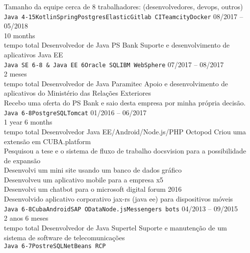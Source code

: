 \begin{entrylist}
{    Tamanho da equipe cerca de 8 trabalhadores: (desenvolvedores, devops, outros) \\
    \texttt{Java 4-15}\slashsep\texttt{Kotlin}\slashsep\texttt{Spring}\slashsep\texttt{Postgres}\slashsep\texttt{Elastic}\slashsep\texttt{Gitlab CI}\slashsep\texttt{Teamcity}\slashsep\texttt{Docker}}
    \entry
    {08/2017 -- 05/2018\\\footnotesize{10 months\\tempo total}}
    {Desenvolvedor de Java}
    {PS Bank}
    {
        Suporte e desenvolvimento de aplicativos Java EE \\
        \texttt{Java SE 6-8 \& Java EE 6}\slashsep\texttt{Oracle SQL}\slashsep\texttt{IBM WebSphere}}
    \entry
    {07/2017 -- 08/2017\\\footnotesize{2 meses\\tempo total}}
    {Desenvolvedor de Java}
    {Paramitec}
    {
        Apoio e desenvolvimento de aplicativos do Ministério das Relações Exteriores \\
        Recebo uma oferta do PS Bank e saio desta empresa por minha própria decisão. \\
        \texttt{Java 6-8}\slashsep\texttt{PostgreSQL}\slashsep\texttt{Tomcat}}
    \entry
    {01/2016 -- 06/2017\\\footnotesize{1 year 6 months\\tempo total}}
    {Desenvolvedor Java EE/Android/Node.js/PHP}
    {Octopod}
    {
        Criou uma extensão em CUBA.platform \\
        Pesquisou a tese e o sistema de fluxo de trabalho docsvision para a possibilidade de expansão \\
        Desenvolvi um mini site usando um banco de dados gráfico \\
        Desenvolveu um aplicativo mobile para a empresa x5 \\
        Desenvolvi um chatbot para o microsoft digital forum 2016 \\
        Desenvolvido aplicativo corporativo jax-rs (java ee) para dispositivos móveis\\
    \texttt{Java 6-8}\slashsep\texttt{Cuba}\slashsep\texttt{Android}\slashsep\texttt{SAP OData}\slashsep\texttt{Node.js}\slashsep\texttt{Messengers bots}}
    \entry
    {04/2013 -- 09/2015\\\footnotesize{2 anos 6 meses\\tempo total}}
    {Desenvolvedor de Java}
    {Supertel}
    {
        Suporte e manutenção de um sistema de software de telecomunicações \\
        \texttt{Java 6-7}\slashsep\texttt{PostreSQL}\slashsep\texttt{NetBeans RCP}}


\end{entrylist}
